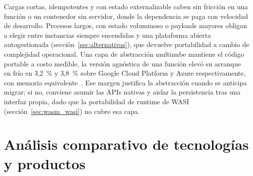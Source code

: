 \documentclass[12pt, letterpaper, table, xcdraw]{inf-pucv}
\begin{document}
Cargas cortas, idempotentes y con estado externalizable caben sin fricción en una función o un contenedor sin servidor, donde la dependencia se paga con velocidad de desarrollo. Procesos largos, con estado voluminoso o payloads mayores obligan a elegir entre instancias siempre encendidas y una plataforma abierta autogestionada (sección~\ref{sec:alternativas}), que devuelve portabilidad a cambio de complejidad operacional. Una capa de abstracción multinube mantiene el código portable a costo medible, la versión agnóstica de una función elevó su arranque en frío en 3,2~\% y 3,8~\% sobre Google Cloud Platform y Azure respectivamente, con memoria equivalente~\parencite{rodrigues2022quickfaas}. Ese margen justifica la abstracción cuando se anticipa migrar; si no, conviene asumir las APIs nativas y aislar la persistencia tras una interfaz propia, dado que la portabilidad de runtime de WASI (sección~\ref{sec:wasm_wasi}) no cubre esa capa.





\section{Análisis comparativo de tecnologías y productos}

\end{document}
